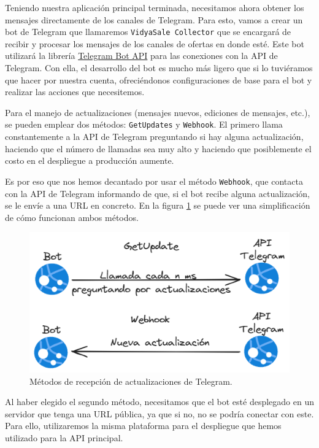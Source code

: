 Teniendo nuestra aplicación principal terminada, necesitamos ahora obtener los 
mensajes directamente de los canales de Telegram. Para esto, vamos a crear un bot 
de Telegram que llamaremos \verb|VidyaSale Collector| que se encargará de recibir 
y procesar los mensajes de los canales de ofertas en donde esté. Este bot 
utilizará la librería 
\href{https://github.com/go-telegram-bot-api/telegram-bot-api}{Telegram Bot API} 
para las conexiones con la API de Telegram. Con ella, el desarrollo del bot es 
mucho más ligero que si lo tuviéramos que hacer por nuestra cuenta, ofreciéndonos 
configuraciones de base para el bot y realizar las acciones que necesitemos.

Para el manejo de actualizaciones (mensajes nuevos, ediciones de mensajes, etc.), 
se pueden emplear dos métodos: \verb|GetUpdates| y \verb|Webhook|. El primero 
llama constantemente a la API de Telegram preguntando si hay alguna actualización, 
haciendo que el número de llamadas sea muy alto y haciendo que posiblemente el 
costo en el despliegue a producción aumente.

Es por eso que nos hemos decantado por usar el método \verb|Webhook|, que contacta 
con la API de Telegram informando de que, si el bot recibe alguna actualización, se 
le envíe a una URL en concreto. En la figura \ref{fig:metodos_actualizacion} se 
puede ver una simplificación de cómo funcionan ambos métodos.

\begin{figure}[h]
    \centering
    \includegraphics[scale=0.55]{figuras/metodos-actualizacion.png}
    \caption{Métodos de recepción de actualizaciones de Telegram.}
    \label{fig:metodos_actualizacion}
\end{figure}

Al haber elegido el segundo método, necesitamos que el bot esté desplegado en un 
servidor que tenga una URL pública, ya que si no, no se podría conectar con este. 
Para ello, utilizaremos la misma plataforma para el despliegue que hemos utilizado 
para la API principal.

